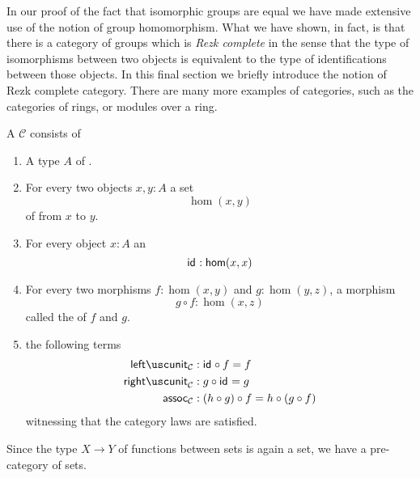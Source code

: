 In our proof of the fact that isomorphic groups are equal we have made extensive use of the notion of group homomorphism. What we have shown, in fact, is that there is a category of groups which is \emph{Rezk complete} in the sense that the type of isomorphisms between two objects is equivalent to the type of identifications between those objects. In this final section we briefly introduce the notion of Rezk complete category. There are many more examples of categories, such as the categories of rings, or modules over a ring.

\begin{defn}
  A  $\mathcal{C}$ consists of
  \begin{enumerate}
  \item A type $A$ of .
  \item For every two objects $x,y:A$ a set
    \begin{equation*}
      \hom(x,y)
    \end{equation*}
    of  from $x$ to $y$.
  \item For every object $x:A$ an 
    \begin{equation*}
      \mathsf{id}_{} : \mathsf{hom}(x,x)
    \end{equation*}
  \item For every two morphisms $f:\hom(x,y)$ and $g:\hom(y,z)$, a morphism
    \begin{equation*}
      g\circ f :\hom(x,z)
    \end{equation*}
    called the  of $f$ and $g$.
  \item the following terms
    \begin{align*}
      \leftunit_{\mathcal{C}} & : \idfunc \circ f = f \\
      \rightunit_{\mathcal{C}} & : g \circ \idfunc = g \\
      \assoc_{\mathcal{C}} & : (h \circ g) \circ f = h \circ (g \circ f)
    \end{align*}
    witnessing that the category laws are satisfied.
  \end{enumerate}
\end{defn}

\begin{eg}
  Since the type $X\to Y$ of functions between sets is again a set, we have a pre-category of sets.
\end{eg}

